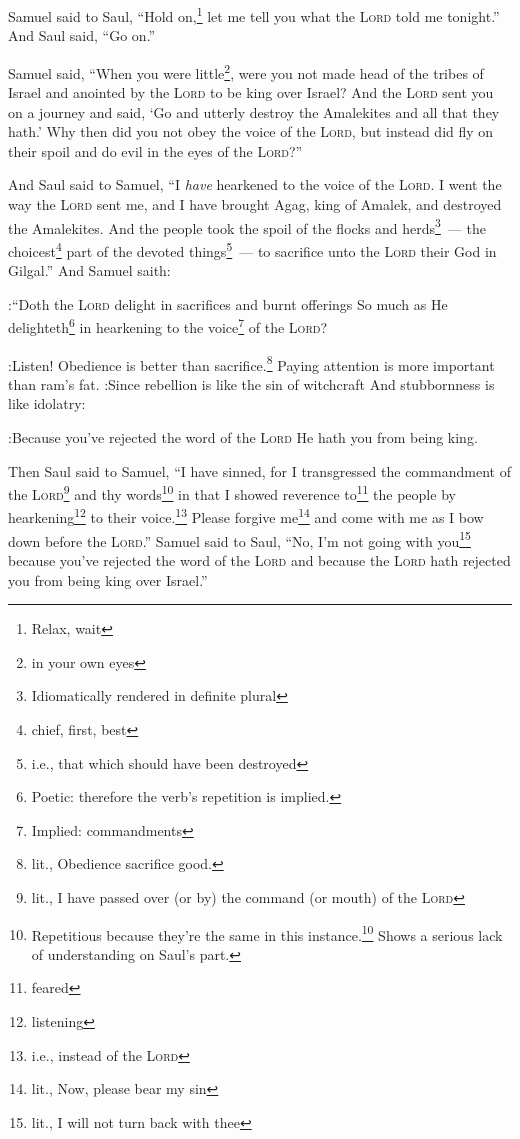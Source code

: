 \begin{inparaenum}
     Samuel said to Saul, ``Hold on,\footnote{Relax, wait} let me tell you what the \textsc{Lord} told me tonight.'' And Saul said, ``Go on.''%
    
     Samuel said, ``When you were little\footnote{in your own eyes}, were you not made head of the tribes of Israel and anointed by the \textsc{Lord} to be king over Israel?%
     And the \textsc{Lord} sent you on a journey and said, `Go and utterly destroy the Amalekites and all that they hath.'%
     Why then did you not obey the voice of the \textsc{Lord}, but instead did fly on their spoil and do evil in the eyes of the \textsc{Lord}?''%
    
     And Saul said to Samuel, ``I \emph{have} hearkened to the voice of the \textsc{Lord}. I went the way the \textsc{Lord} sent me, and I have brought Agag, king of Amalek, and destroyed the Amalekites.%
     And the people took the spoil of the flocks and herds\footnote{Idiomatically rendered in definite plural}~--- the choicest\footnote{chief, first, best} part of the devoted things\footnote{i.e., that which should have been destroyed}~--- to sacrifice unto the \textsc{Lord} their God in Gilgal.''%
     And Samuel saith:
    
:``Doth the \textsc{Lord} delight in sacrifices and burnt offerings So much as He delighteth\footnote{Poetic: therefore the verb's repetition is implied.} in hearkening to the voice\footnote{Implied: commandments} of the \textsc{Lord}?
    
:Listen! Obedience is better than sacrifice.\footnote{lit., Obedience sacrifice good.} Paying attention is more important than ram's fat.%
     :Since rebellion is like the sin of witchcraft And stubbornness is like idolatry:
    
:Because you've rejected the word of the \textsc{Lord} He hath you from being king.%
    
     Then Saul said to Samuel, ``I have sinned, for I transgressed the commandment of the \textsc{Lord}\footnote{lit., I have passed over (or by) the command (or mouth) of the \textsc{Lord}} and thy words\footnote{Repetitious because they're the same in this instance.\footnote{cf. DyC 1:38} Shows a serious lack of understanding on Saul's part.} in that I showed reverence to\footnote{feared} the people by hearkening\footnote{listening} to their voice.\footnote{i.e., instead of the \textsc{Lord}}%
     Please forgive me\footnote{lit., Now, please bear my sin} and come with me as I bow down before the \textsc{Lord}.''%
     Samuel said to Saul, ``No, I'm not going with you\footnote{lit., I will not turn back with thee} because you've rejected the word of the \textsc{Lord} and because the \textsc{Lord} hath rejected you from being king over Israel.''%
    

\end{inparaenum}
